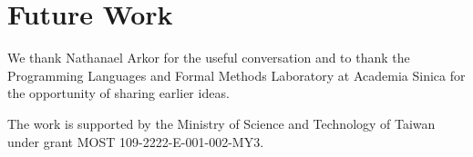 \documentclass[acmsmall]{acmart}
\theoremstyle{acmdefinition}
\begin{document}
\citep{Xie2018}

\section{Future Work}
\begin{acks}
We thank Nathanael Arkor for the useful conversation and to thank the Programming Languages and Formal Methods Laboratory at Academia Sinica for the opportunity of sharing earlier ideas.

The work is supported by the Ministry of Science and Technology of Taiwan under grant MOST 109-2222-E-001-002-MY3.
\end{acks}



\end{document}
